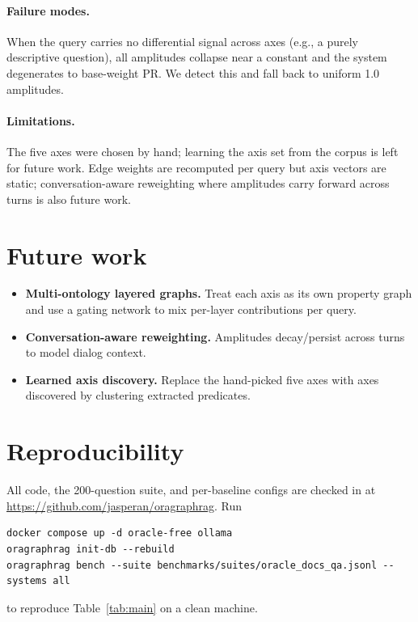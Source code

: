 \documentclass{article}
\begin{document}
\paragraph{Failure modes.} When the query carries no differential signal
across axes (e.g., a purely descriptive question), all amplitudes
collapse near a constant and the system degenerates to base-weight PR.
We detect this and fall back to uniform 1.0 amplitudes.

\paragraph{Limitations.} The five axes were chosen by hand; learning the
axis set from the corpus is left for future work. Edge weights are
recomputed per query but axis vectors are static; conversation-aware
reweighting where amplitudes carry forward across turns is also future
work.

\section{Future work}
\label{sec:future}

\begin{itemize}
  \item \textbf{Multi-ontology layered graphs.} Treat each axis as its own
        property graph and use a gating network to mix per-layer
        contributions per query.
  \item \textbf{Conversation-aware reweighting.} Amplitudes decay/persist
        across turns to model dialog context.
  \item \textbf{Learned axis discovery.} Replace the hand-picked five axes
        with axes discovered by clustering extracted predicates.
\end{itemize}

\section*{Reproducibility}

All code, the 200-question suite, and per-baseline configs are checked in
at \url{https://github.com/jasperan/oragraphrag}. Run

\begin{verbatim}
docker compose up -d oracle-free ollama
oragraphrag init-db --rebuild
oragraphrag bench --suite benchmarks/suites/oracle_docs_qa.jsonl --systems all
\end{verbatim}

to reproduce Table~\ref{tab:main} on a clean machine.
\end{document}
